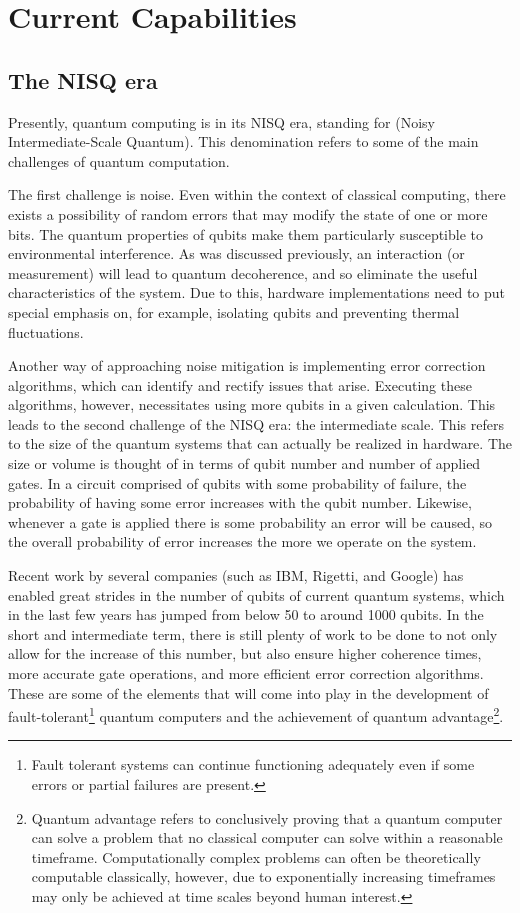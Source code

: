 \section{Current Capabilities}

\subsection{The NISQ era}
Presently, quantum computing is in its NISQ era, standing for (Noisy Intermediate-Scale Quantum)\cite{Preskill2018}. This denomination refers to some of the main challenges of quantum computation. 

The first challenge is noise. Even within the context of classical computing, there exists a possibility of random errors that may modify the state of one or more bits. The quantum properties of qubits make them particularly susceptible to environmental interference. As was discussed previously, an interaction (or measurement) will lead to quantum decoherence, and so eliminate the useful characteristics of the system. Due to this, hardware implementations need to put special emphasis on, for example, isolating qubits and preventing thermal fluctuations. 

Another way of approaching noise mitigation is implementing error correction algorithms, which can identify and rectify issues that arise. Executing these algorithms, however, necessitates using more qubits in a given calculation. This leads to the second challenge of the NISQ era: the intermediate scale. This refers to the size of the quantum systems that can actually be realized in hardware. The size or volume is thought of in terms of qubit number and number of applied gates. In a circuit comprised of qubits with some probability of failure, the probability of having some error increases with the qubit number. Likewise, whenever a gate is applied there is some probability an error will be caused, so the overall probability of error increases the more we operate on the system.

Recent work by several companies (such as IBM, Rigetti, and Google) has enabled great strides in the number of qubits of current quantum systems, which in the last few years has jumped from below 50 to around 1000 qubits. In the short and intermediate term, there is still plenty of work to be done to not only allow for the increase of this number, but also ensure higher coherence times, more accurate gate operations, and more efficient error correction algorithms. These are some of the elements that will come into play in the development of fault-tolerant\footnote{Fault tolerant systems can continue functioning adequately even if some errors or partial failures are present.} quantum computers and the achievement of quantum advantage\footnote{Quantum advantage refers to conclusively proving that a quantum computer can solve a problem that no classical computer can solve within a reasonable timeframe. Computationally complex problems can often be theoretically computable classically, however, due to exponentially increasing timeframes may only be achieved at time scales beyond human interest.}.

